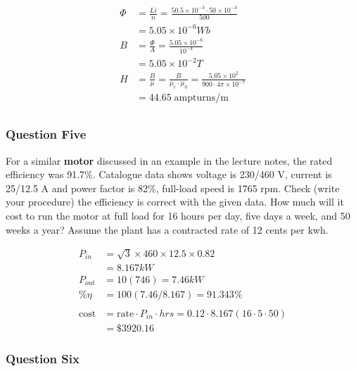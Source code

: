 \documentclass[a4paper,11pt]{article}
\begin{document}
\begin{align*}
    \Phi & = \frac{Li}{n} = \frac{50.5\times10^{-3} \cdot 50 \times 10^{-3}}{500}                                \\&= 5.05\times10^{-6}Wb\\
    B    & = \frac{\Phi}{A} = \frac{5.05\times10^{-6}}{10^{-4}}                                                  \\
         & = 5.05\times10^{-2}T                                                                                  \\
    H    & = \frac{B}{\mu} = \frac{B}{\mu_r \cdot \mu_0} = \frac{5.05\times10^{2}}{900 \cdot 4\pi\times 10^{-7}} \\
         & = 44.65 \; \mathrm{ampturns/m}                                                                        \\
\end{align*}

\subsubsection*{Question Five}
For a similar \textbf{motor} discussed in an example in the lecture notes, the rated efficiency was 91.7\%. Catalogue data shows voltage is 230/460 V, current is 25/12.5 A and power factor is 82\%, full-load speed is 1765 rpm. Check (write your procedure) the efficiency is correct with the given data. How much will it cost to run the motor at full load for 16 hours per day, five days a week, and 50 weeks a year? Assume the plant has a contracted rate of 12 cents per kwh.

\begin{align*}
    P_{in}  & =\sqrt{3}\times460\times12.5\times0.82 \\
            & = 8.167kW                              \\
    P_{out} & = 10(746) = 7.46kW                     \\
    \%\eta  & = 100(7.46/8.167)=91.343\%             \\\\
    \mathrm{cost} &= \mathrm{rate}{\cdot}P_{in}{\cdot}hrs = 0.12{\cdot}8.167(16{\cdot}5{\cdot}50) \\
                  &=\$3920.16
\end{align*}

\subsubsection*{Question Six}
\end{document}

